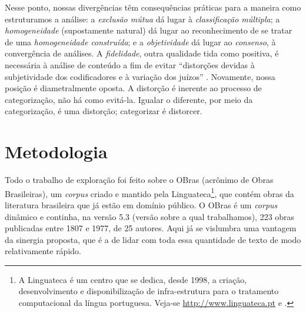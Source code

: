 \documentclass[portuguese]{textolivre}
\begin{document}
Nesse ponto, nossas divergências têm consequências práticas para a maneira como estruturamos a análise: a \textit{exclusão mútua} dá lugar à \textit{classificação múltipla}; a \textit{homogeneidade} (supostamente natural) dá lugar ao reconhecimento de se tratar de uma \textit{homogeneidade construída}; e a \textit{objetividade} dá lugar ao \textit{consenso}, à convergência de análises. A \textit{fidelidade}, outra qualidade tida como positiva, é necessária à análise de conteúdo a fim de evitar “distorções devidas à subjetividade dos codificadores e à variação dos juízos” \cite[p. 120]{bardln1977}. Novamente, nossa posição é diametralmente oposta. A distorção é inerente ao processo de categorização, não há como evitá-la. Igualar o diferente, por meio da categorização, é uma distorção; categorizar é distorcer.

\section{Metodologia}\label{sec-3}
Todo o trabalho de exploração foi feito sobre o OBras (acrônimo de Obras Brasileiras), um \textit{corpus} criado e mantido pela Linguateca\footnote{A Linguateca é um centro que se dedica, desde 1998, a criação, desenvolvimento e disponibilização de infra-estrutura para o tratamento computacional da língua portuguesa. Veja-se \url{http://www.linguateca.pt} e \textcite{santos2019}.}, que contém obras da literatura brasileira que já estão em domínio público. O OBras é um \textit{corpus} dinâmico e continha, na versão 5.3 (versão sobre a qual trabalhamos), 223 obras publicadas entre 1807 e 1977, de 25 autores. Aqui já se vislumbra uma vantagem da sinergia proposta, que é a de lidar com toda essa quantidade de texto de modo relativamente rápido.
\end{document}
